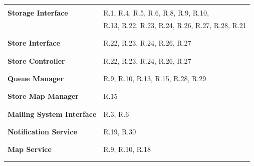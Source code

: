 \documentclass[a4paper, 12pt, oneside, table]{article}
\begin{document}
\begin{tabularx}{\linewidth}{| g || p{10cm} |}
    \hline
    \rule{0pt}{15pt}& \\
    \large{\textbf{Storage Interface}} &  R.1, R.4, R.5, R.6, R.8, R.9, R.10, \\
    &  R.13, R.22, R.23, R.24, R.26, R.27, R.28, R.21\\
    & \\
    \hline
    \rule{0pt}{15pt}& \\
    \large{\textbf{Store Interface}} &  R.22, R.23, R.24, R.26, R.27\\
    & \\
    \hline
    \rule{0pt}{15pt}& \\
    \large{\textbf{Store Controller}} &  R.22, R.23, R.24, R.26, R.27\\
    & \\
    \hline
    \rule{0pt}{15pt}& \\
    \large{\textbf{Queue Manager}} &  R.9, R.10, R.13, R.15, R.28, R.29\\
    & \\
    \hline
    \rule{0pt}{15pt}& \\
    \large{\textbf{Store Map Manager}} &  R.15\\
    & \\
    \hline
    \rule{0pt}{15pt}& \\
    \large{\textbf{Mailing System Interface}} &  R.3, R.6\\
    & \\
    \hline
    \rule{0pt}{15pt}& \\
    \large{\textbf{Notification Service}} &  R.19, R.30\\
    & \\
    \hline
    \rule{0pt}{15pt}& \\
    \large{\textbf{Map Service}} &  R.9, R.10, R.18\\
    & \\
    \hline
    \rule{0pt}{15pt}& \\

\end{tabularx}
\end{document}
